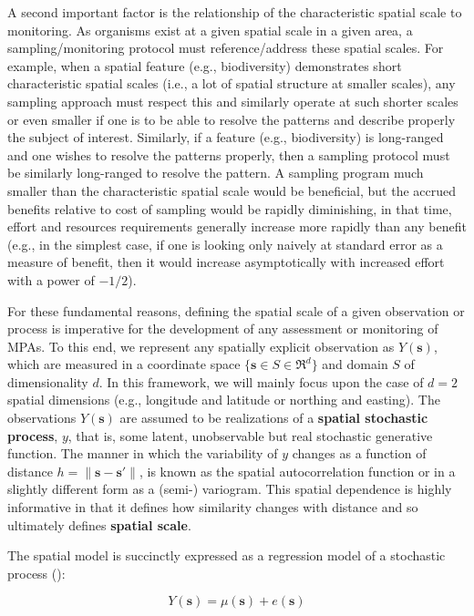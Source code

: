 \documentclass[letterpaper,portrait,11pt]{scrartcl}
\numberwithin{equation}{section}    %
\numberwithin{figure}{section}    %
\numberwithin{table}{section}       %
\begin{document}
A second important factor is the relationship of the characteristic spatial scale to monitoring. As organisms exist at a given spatial scale in a given area, a sampling/monitoring protocol must reference/address these spatial scales. For example, when a spatial feature (e.g., biodiversity) demonstrates short characteristic spatial scales (i.e., a lot of spatial structure at smaller scales), any sampling approach must respect this and similarly operate at such shorter scales or even smaller if one is to be able to resolve the patterns and describe properly the subject of interest. Similarly, if a feature (e.g., biodiversity) is long-ranged and one wishes to resolve the patterns properly, then a sampling protocol must be similarly long-ranged to resolve the pattern. A sampling program much smaller than the characteristic spatial scale would be beneficial, but the accrued benefits relative to cost of sampling would be rapidly diminishing, in that time, effort and resources requirements generally increase more rapidly than any benefit (e.g., in the simplest case, if one is looking only naively at standard error as a measure of benefit, then it would increase asymptotically with increased effort with a power of $-1/2$). 

For these fundamental reasons, defining the spatial scale of a given observation or process is imperative for the development of any assessment or monitoring of MPAs. To this end, we represent any spatially explicit observation as $Y(\bm{s})$, which are measured in a coordinate space $\{ \bm{s} \in S \in \Re^d \}$ and domain $S$ of dimensionality $d$. In this framework, we will mainly focus upon the case of $d=2$ spatial dimensions (e.g., longitude and latitude or northing and easting). The observations $Y(\bm{s})$ are assumed to be realizations of a \textbf{spatial stochastic process}, $y$, that is, some latent, unobservable but real stochastic generative function. The manner in which the variability of $y$ changes as a function of distance $h=\| \bm{s} - \bm{s}' \|$, is known as the spatial autocorrelation function or in a slightly different form as a (semi-) variogram. This spatial dependence is highly informative in that it defines how similarity changes with distance and so ultimately defines \textbf{spatial scale}. 

The spatial model is succinctly expressed as a regression model of a stochastic process (\cite{banerjee2014hierarchical}):

\begin{equation}
Y(\bm{s}) = \mu(\bm{s}) + e(\bm{s})
\label{eq:spatialModel}
\end{equation}
\end{document}
